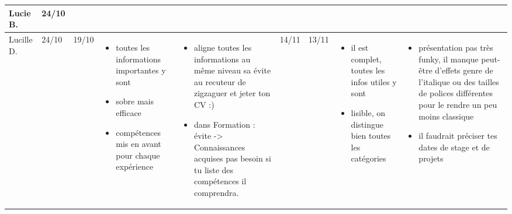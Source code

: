 \documentclass[a4paper,11pt]{article}
\begin{document}
\begin{landscape}
\begin{longtable}{|l|l|l|p{4cm}|p{4cm}|l|l|p{4cm}|p{4cm}|}
    Lucie B. & 24/10 & & & & & & & \\ \hline %

    Lucille D.  & 24/10 & 19/10
				& \begin{itemize}
				  \item toutes les informations importantes y sont
				  \item sobre mais efficace
				  \item compétences mis en avant pour chaque expérience
				  \end{itemize}
				& \begin{itemize}
				  \item aligne toutes les informations au même niveau sa évite au recuteur de zigzaguer et jeter ton CV :)
				  \item dans Formation : évite -> Connaissances acquises  pas besoin si tu liste des compétences il comprendra.
				  \end{itemize}
				& 14/11 & 13/11
				& \begin{itemize}
				  \item il est complet, toutes les infos utiles y sont
				  \item lisible, on distingue bien toutes les catégories
				  \end{itemize}
				& \begin{itemize}
				  \item présentation pas très funky, il manque peut-être d'effets genre de l'italique ou des tailles de polices différentes pour le rendre un peu moins classique
				  \item il faudrait préciser tes dates de stage et de projets
				  \end{itemize} \\ \hline


\end{longtable}
\end{landscape}
\end{document}
